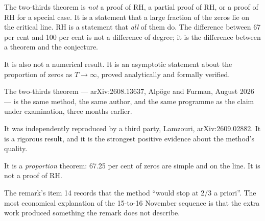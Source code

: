 The two-thirds theorem is \emph{not} a proof of RH, a partial proof of RH, or
a proof of RH for a special case. It is a statement that a large fraction of
the zeros lie on the critical line. RH is a statement that \emph{all} of them
do. The difference between 67 per cent and 100 per cent is not a difference
of degree; it is the difference between a theorem and the conjecture.

It is also not a numerical result. It is an asymptotic statement about the
proportion of zeros as $T \to \infty$, proved analytically and formally
verified.

\begin{keytakeaways}

\item The two-thirds theorem --- arXiv:2608.13637, Alpöge and Furman, August
2026 --- is the same method, the same author, and the same programme as the
claim under examination, three months earlier.
\item It was independently reproduced by a third party, Lamzouri,
arXiv:2609.02882. It is a rigorous result, and it is the strongest positive
evidence about the method's quality.
\item It is a \emph{proportion} theorem: 67.25 per cent of zeros are simple
and on the line. It is not a proof of RH.
\item The remark's item 14 records that the method ``would stop at 2/3
a priori''. The most economical explanation of the 15-to-16 November sequence
is that the extra work produced something the remark does not describe.
\end{keytakeaways}
